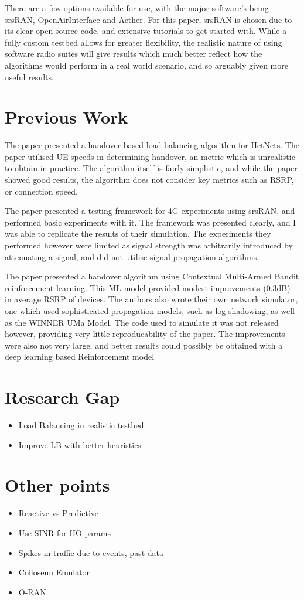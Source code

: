There are a few options available for use, with the major software's being srsRAN, OpenAirInterface and Aether. For this paper, srsRAN is chosen due to its clear open source code, and extensive tutorials to get started with. While a fully custom testbed allows for greater flexibility, the realistic nature of using software radio suites will give results which much better reflect how the algorithms would perform in a real world scenario, and so arguably given more useful results.


\section{Previous Work}


\citet{hatipoglu_handover-based_2020} The paper presented a handover-based load balancing algorithm for HetNets. The paper utilised UE speeds in determining handover, an metric which is unrealistic to obtain in practice. The algorithm itself is fairly simplistic, and while the paper showed good results, the algorithm does not consider key metrics such as RSRP, or connection speed.
 
\citet{powell_handover_2021} The paper presented a testing framework for 4G experiments using srsRAN, and performed basic experiments with it. The framework was presented clearly, and I was able to replicate the results of their simulation. The experiments they performed however were limited as signal strength was arbitrarily introduced by attenuating a signal, and did not utilise signal propagation algorithms.

\citet{yajnanarayana_5g_2020} The paper presented a handover algorithm using Contextual Multi-Armed Bandit reinforcement learning. This ML model provided modest improvements (0.3dB) in average RSRP of devices. The authors also wrote their own network simulator, one which used sophisticated propagation models, such as log-shadowing, as well as the WINNER UMa Model. The code used to simulate it was not released however, providing very little reproducability of the paper. The improvements were also not very large, and better results could possibly be obtained with a deep learning based Reinforcement model

\section{Research Gap}
\begin{itemize}
    \item Load Balancing in realistic testbed
    \item Improve LB with better heuristics
\end{itemize}

\section{Other points}
\begin{itemize}
    \item Reactive vs Predictive
    \item Use SINR for HO params
    \item Spikes in traffic due to events, past data
    \item Colloseun Emulator
    \item O-RAN
\end{itemize}